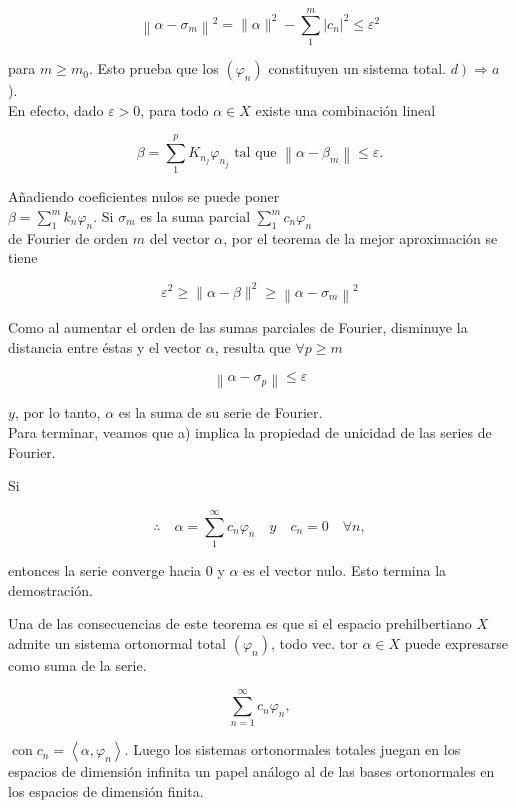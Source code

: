 \documentclass[10pt]{article}
\theoremstyle{plain}
\theoremstyle{definition}
\theoremstyle{remark}
\begin{document}
$$
\left\|\alpha-\sigma_{m}\right\|^{2}=\|\alpha\|^{2}-\sum_{1}^{m}\left|c_{n}\right|^{2} \leqslant \varepsilon^{2}
$$

para $m \geqslant m_{0}$. Esto prueba que los $\left(\varphi_{n}\right)$ constituyen un sistema total. $\left.d\right) \Rightarrow a$ ).\\
En efecto, dado $\varepsilon>0$, para todo $\alpha \in X$ existe una combinación lineal

$$
\beta=\sum_{1}^{p} K_{n_{j}} \varphi_{n_{j}} \text { tal que }\left\|\alpha-\beta_{m}\right\| \leqslant \varepsilon .
$$

Añadiendo coeficientes nulos se puede poner\\
$\beta=\sum_{1}^{m} k_{n} \varphi_{n}$. Si $\sigma_{m}$ es la suma parcial $\sum_{1}^{m} c_{n} \varphi_{n}$\\
de Fourier de orden $m$ del vector $\alpha$, por el teorema de la mejor aproximación se tiene

$$
\varepsilon^{2} \geqslant\|\alpha-\beta\|^{2} \geqslant\left\|\alpha-\sigma_{m}\right\|^{2}
$$

Como al aumentar el orden de las sumas parciales de Fourier, disminuye la distancia entre éstas y el vector $\alpha$, resulta que $\forall p \geqslant m$

$$
\left\|\alpha-\sigma_{p}\right\| \leqslant \varepsilon
$$

$y$, por lo tanto, $\alpha$ es la suma de su serie de Fourier.\\
Para terminar, veamos que a) implica la propiedad de unicidad de las series de Fourier.

Si

$$
\therefore \quad \alpha=\sum_{1}^{\infty} c_{n} \varphi_{n} \quad y \quad c_{n}=0 \quad \forall n,
$$


entonces la serie converge hacia 0 y $\alpha$ es el vector nulo. Esto termina la demostración.

Una de las consecuencias de este teorema es que si el espacio prehilbertiano $X$ admite un sistema ortonormal total $\left(\varphi_{n}\right)$, todo vec. tor $\alpha \in X$ puede expresarse como suma de la serie.

$$
\sum_{n=1}^{\infty} c_{n} \varphi_{n},
$$

$\operatorname{con} c_{n}=\left\langle\alpha, \varphi_{n}\right\rangle$. Luego los sistemas ortonormales totales juegan en los espacios de dimensión infinita un papel análogo al de las bases ortonormales en los espacios de dimensión finita.
\end{document}
